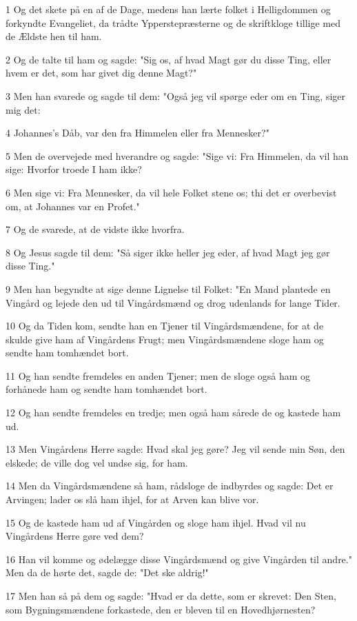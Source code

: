 \par 1 Og det skete på en af de Dage, medens han lærte folket i Helligdommen og forkyndte Evangeliet, da trådte Ypperstepræsterne og de skriftkloge tillige med de Ældste hen til ham.
\par 2 Og de talte til ham og sagde: "Sig os, af hvad Magt gør du disse Ting, eller hvem er det, som har givet dig denne Magt?"
\par 3 Men han svarede og sagde til dem: "Også jeg vil spørge eder om en Ting, siger mig det:
\par 4 Johannes's Dåb, var den fra Himmelen eller fra Mennesker?"
\par 5 Men de overvejede med hverandre og sagde: "Sige vi: Fra Himmelen, da vil han sige: Hvorfor troede I ham ikke?
\par 6 Men sige vi: Fra Mennesker, da vil hele Folket stene os; thi det er overbevist om, at Johannes var en Profet."
\par 7 Og de svarede, at de vidste ikke hvorfra.
\par 8 Og Jesus sagde til dem: "Så siger ikke heller jeg eder, af hvad Magt jeg gør disse Ting."
\par 9 Men han begyndte at sige denne Lignelse til Folket: "En Mand plantede en Vingård og lejede den ud til Vingårdsmænd og drog udenlands for lange Tider.
\par 10 Og da Tiden kom, sendte han en Tjener til Vingårdsmændene, for at de skulde give ham af Vingårdens Frugt; men Vingårdsmændene sloge ham og sendte ham tomhændet bort.
\par 11 Og han sendte fremdeles en anden Tjener; men de sloge også ham og forhånede ham og sendte ham tomhændet bort.
\par 12 Og han sendte fremdeles en tredje; men også ham sårede de og kastede ham ud.
\par 13 Men Vingårdens Herre sagde: Hvad skal jeg gøre? Jeg vil sende min Søn, den elskede; de ville dog vel undse sig, for ham.
\par 14 Men da Vingårdsmændene så ham, rådsloge de indbyrdes og sagde: Det er Arvingen; lader os slå ham ihjel, for at Arven kan blive vor.
\par 15 Og de kastede ham ud af Vingården og sloge ham ihjel. Hvad vil nu Vingårdens Herre gøre ved dem?
\par 16 Han vil komme og ødelægge disse Vingårdsmænd og give Vingården til andre." Men da de hørte det, sagde de: "Det ske aldrig!"
\par 17 Men han så på dem og sagde: "Hvad er da dette, som er skrevet: Den Sten, som Bygningsmændene forkastede, den er bleven til en Hovedhjørnesten?
